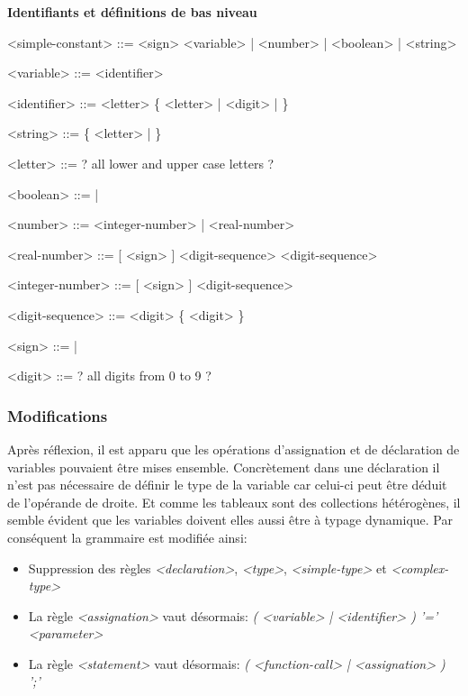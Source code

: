 \documentclass[french]{article}
\begin{document}
				\textbf{Identifiants et définitions de bas niveau}
				\begin{grammar}
					<simple-constant> ::= <sign> <variable> | <number> | <boolean> | <string>
					
					<variable> ::= <identifier>
					
					<identifier> ::= <letter> \{ <letter> | <digit> | \lit{\_} \}
					
					<string> ::=  \{ <letter> | \lit{ } \} 
					
					<letter> ::= ? all lower and upper case letters ? 
					
					<boolean> ::=  | 
					
					<number> ::= <integer-number> | <real-number>
					
					<real-number> ::= [ <sign> ] <digit-sequence>  <digit-sequence>
					
					<integer-number> ::= [ <sign> ] <digit-sequence>
					
					<digit-sequence> ::= <digit> \{ <digit> \}
					
					<sign> ::= \lit{+} | \lit{-} 
					
					<digit> ::= ? all digits from 0 to 9 ? 
				\end{grammar}
				
			\subsubsection{Modifications}
				Après réflexion, il est apparu que les opérations d'assignation et de déclaration de variables pouvaient être mises ensemble. Concrètement dans une déclaration il n'est pas nécessaire de définir le type de la variable car celui-ci peut être déduit de l'opérande de droite. Et comme les tableaux sont des collections hétérogènes, il semble évident que les variables doivent elles aussi être à typage dynamique. Par conséquent la grammaire est modifiée ainsi:
				\begin{itemize}
					\item Suppression des règles \textit{<declaration>}, \textit{<type>}, \textit{<simple-type>} et \textit{<complex-type>}
					\item La règle \textit{<assignation>} vaut désormais: \textit{( <variable> | <identifier> ) '=' <parameter>}
					\item La règle \textit{<statement>} vaut désormais: \textit{( <function-call> | <assignation> ) ';'}
				\end{itemize} 
		
\end{document}
